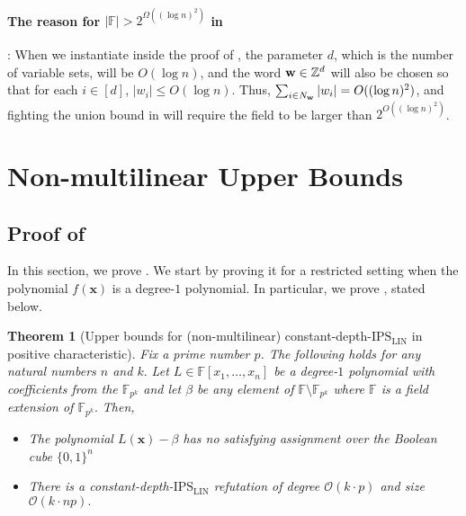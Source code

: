 \documentclass[11pt]{article}
\newtheorem{theorem}{Theorem}[section]
\newcommand{\Boo}{\{0,1 \}}
\newcommand{\bigO}{\mathcal{O}}
\newcommand{\F}{\mathbb{F}}
\newcommand{\IPSLIN}{\mathrm{IPS}_{\mathrm{LIN}}}
\begin{document}
\paragraph{The reason for $|\F|>2^{\Omega((\log n)^2)}$ in }: When we instantiate  inside the proof of , the parameter $d$, which is the number of variable sets, will be $O(\log n)$, and the word $\mathbf{w} \in \mathbb{Z}^d$ will also be chosen so that for each $i\in [d]$, $|w_i|\leq O(\log n)$. Thus, $\sum_{i\in N_{\mathbf{w}}}|w_i| = O((\log n)^2)$, and fighting the union bound in  will require the field to be larger than $2^{O((\log n)^2)}$. 



\section{Non-multilinear Upper Bounds}

\subsection{Proof of }
In this section, we prove . We start by proving it for a restricted setting when the polynomial $f(\mathbf{x})$ is a degree-$1$ polynomial. In particular, we prove , stated below.

\begin{theorem}[Upper bounds for (non-multilinear) constant-depth-$\IPSLIN$ in positive characteristic]\label{thm:ubd-const-depth-linear}
Fix a prime number $p$. The following holds for any natural numbers $n$ and $k.$\newline
Let $L \in \F[x_1,\ldots,x_n]$ be a degree-$1$ polynomial with coefficients from the $\F_{p^k}$ and let $\beta$ be any element of $\F\setminus\F_{p^k}$ where $\F$ is a field extension of $\F_{p^k}.$\newline
Then, 
\begin{itemize}
    \item The polynomial $L(\mathbf{x})-\beta$ has no satisfying assignment over the Boolean cube $\Boo^{n}$
    \item There is a constant-depth-$\IPSLIN$ refutation of degree $\bigO(k \cdot p)$ and size $\bigO(k \cdot np).$
\end{itemize}
\end{theorem}
\end{document}
